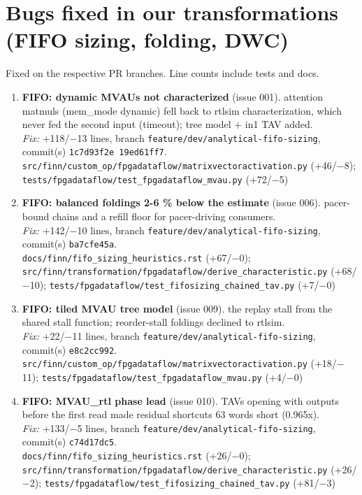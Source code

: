 \documentclass[a4paper,10pt]{article}
\begin{document}
\section*{Bugs fixed in our transformations (FIFO sizing, folding, DWC)}
Fixed on the respective PR branches. Line counts include tests and docs.
\begin{enumerate}
\item \textbf{FIFO: dynamic MVAUs not characterized} (issue 001). attention matmuls (mem\_mode dynamic) fell back to rtlsim characterization, which never fed the second input (timeout); tree model + in1 TAV added.\\
\emph{Fix:} +118/$-$13 lines, branch \texttt{feature/dev/analytical-fifo-sizing}, commit(s) \texttt{1c7d93f2e 19ed61ff7}.\\
{\footnotesize \texttt{src/finn/custom\_op/fpgadataflow/matrixvectoractivation.py} (+46/$-$8); \texttt{tests/fpgadataflow/test\_fpgadataflow\_mvau.py} (+72/$-$5)}
\item \textbf{FIFO: balanced foldings 2-6 \% below the estimate} (issue 006). pacer-bound chains and a refill floor for pacer-driving consumers.\\
\emph{Fix:} +142/$-$10 lines, branch \texttt{feature/dev/analytical-fifo-sizing}, commit(s) \texttt{ba7cfe45a}.\\
{\footnotesize \texttt{docs/finn/fifo\_sizing\_heuristics.rst} (+67/$-$0); \texttt{src/finn/transformation/fpgadataflow/derive\_characteristic.py} (+68/$-$10); \texttt{tests/fpgadataflow/test\_fifosizing\_chained\_tav.py} (+7/$-$0)}
\item \textbf{FIFO: tiled MVAU tree model} (issue 009). the replay stall from the shared stall function; reorder-stall foldings declined to rtlsim.\\
\emph{Fix:} +22/$-$11 lines, branch \texttt{feature/dev/analytical-fifo-sizing}, commit(s) \texttt{e8c2cc992}.\\
{\footnotesize \texttt{src/finn/custom\_op/fpgadataflow/matrixvectoractivation.py} (+18/$-$11); \texttt{tests/fpgadataflow/test\_fpgadataflow\_mvau.py} (+4/$-$0)}
\item \textbf{FIFO: MVAU\_rtl phase lead} (issue 010). TAVs opening with outputs before the first read made residual shortcuts 63 words short (0.965x).\\
\emph{Fix:} +133/$-$5 lines, branch \texttt{feature/dev/analytical-fifo-sizing}, commit(s) \texttt{c74d17dc5}.\\
{\footnotesize \texttt{docs/finn/fifo\_sizing\_heuristics.rst} (+26/$-$0); \texttt{src/finn/transformation/fpgadataflow/derive\_characteristic.py} (+26/$-$2); \texttt{tests/fpgadataflow/test\_fifosizing\_chained\_tav.py} (+81/$-$3)}

\end{enumerate}
\end{document}
